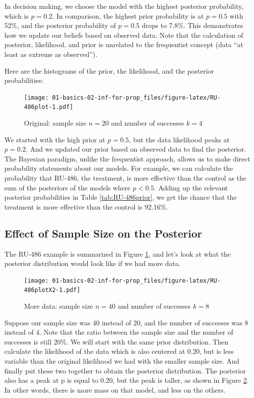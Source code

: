 \documentclass[]{book}
\theoremstyle{definition}
\theoremstyle{definition}
\theoremstyle{definition}
\theoremstyle{remark}
\begin{document}
In decision making, we choose the model with the highest posterior
probability, which is \(p=0.2\). In comparison, the highest prior
probability is at \(p=0.5\) with 52\%, and the posterior probability of
\(p=0.5\) drops to 7.8\%. This demonstrates how we update our beliefs
based on observed data. Note that the calculation of posterior,
likelihood, and prior is unrelated to the frequentist concept (data ``at
least as extreme as observed'').

Here are the histograms of the prior, the likelihood, and the posterior
probabilities:

\begin{figure}[htbp]
\centering
\texttt{[image: 01-basics-02-inf-for-prop\_files/figure-latex/RU-486plot-1.pdf]}
\caption{\label{fig:RU-486plot}Original: sample size \(n=20\) and number of
successes \(k=4\)}
\end{figure}

We started with the high prior at \(p=0.5\), but the data likelihood
peaks at \(p=0.2\). And we updated our prior based on observed data to
find the posterior. The Bayesian paradigm, unlike the frequentist
approach, allows us to make direct probability statements about our
models. For example, we can calculate the probability that RU-486, the
treatment, is more effective than the control as the sum of the
posteriors of the models where \(p<0.5\). Adding up the relevant
posterior probabilities in Table \ref{tab:RU-486prior}, we get the
chance that the treatment is more effective than the control is 92.16\%.

\subsection{Effect of Sample Size on the
Posterior}\label{effect-of-sample-size-on-the-posterior}

The RU-486 example is summarized in Figure \ref{fig:RU-486plot}, and
let's look at what the posterior distribution would look like if we had
more data.

\begin{figure}[htbp]
\centering
\texttt{[image: 01-basics-02-inf-for-prop\_files/figure-latex/RU-486plotX2-1.pdf]}
\caption{\label{fig:RU-486plotX2}More data: sample size \(n=40\) and number
of successes \(k=8\)}
\end{figure}

Suppose our sample size was 40 instead of 20, and the number of
successes was 8 instead of 4. Note that the ratio between the sample
size and the number of successes is still 20\%. We will start with the
same prior distribution. Then calculate the likelihood of the data which
is also centered at 0.20, but is less variable than the original
likelihood we had with the smaller sample size. And finally put these
two together to obtain the posterior distribution. The posterior also
has a peak at p is equal to 0.20, but the peak is taller, as shown in
Figure \ref{fig:RU-486plotX2}. In other words, there is more mass on
that model, and less on the others.
\end{document}
